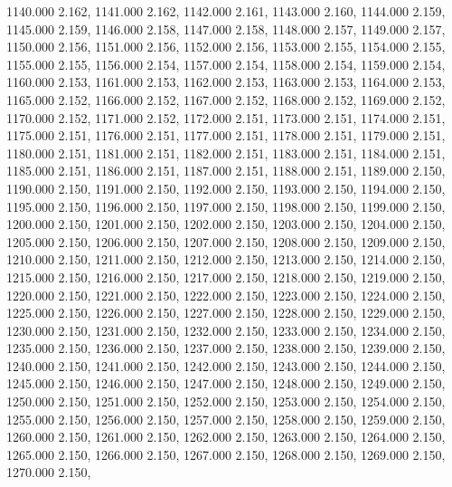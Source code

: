 1140.000 2.162, 
1141.000 2.162, 
1142.000 2.161, 
1143.000 2.160, 
1144.000 2.159, 
1145.000 2.159, 
1146.000 2.158, 
1147.000 2.158, 
1148.000 2.157, 
1149.000 2.157, 
1150.000 2.156, 
1151.000 2.156, 
1152.000 2.156, 
1153.000 2.155, 
1154.000 2.155, 
1155.000 2.155, 
1156.000 2.154, 
1157.000 2.154, 
1158.000 2.154, 
1159.000 2.154, 
1160.000 2.153, 
1161.000 2.153, 
1162.000 2.153, 
1163.000 2.153, 
1164.000 2.153, 
1165.000 2.152, 
1166.000 2.152, 
1167.000 2.152, 
1168.000 2.152, 
1169.000 2.152, 
1170.000 2.152, 
1171.000 2.152, 
1172.000 2.151, 
1173.000 2.151, 
1174.000 2.151, 
1175.000 2.151, 
1176.000 2.151, 
1177.000 2.151, 
1178.000 2.151, 
1179.000 2.151, 
1180.000 2.151, 
1181.000 2.151, 
1182.000 2.151, 
1183.000 2.151, 
1184.000 2.151, 
1185.000 2.151, 
1186.000 2.151, 
1187.000 2.151, 
1188.000 2.151, 
1189.000 2.150, 
1190.000 2.150, 
1191.000 2.150, 
1192.000 2.150, 
1193.000 2.150, 
1194.000 2.150, 
1195.000 2.150, 
1196.000 2.150, 
1197.000 2.150, 
1198.000 2.150, 
1199.000 2.150, 
1200.000 2.150, 
1201.000 2.150, 
1202.000 2.150, 
1203.000 2.150, 
1204.000 2.150, 
1205.000 2.150, 
1206.000 2.150, 
1207.000 2.150, 
1208.000 2.150, 
1209.000 2.150, 
1210.000 2.150, 
1211.000 2.150, 
1212.000 2.150, 
1213.000 2.150, 
1214.000 2.150, 
1215.000 2.150, 
1216.000 2.150, 
1217.000 2.150, 
1218.000 2.150, 
1219.000 2.150, 
1220.000 2.150, 
1221.000 2.150, 
1222.000 2.150, 
1223.000 2.150, 
1224.000 2.150, 
1225.000 2.150, 
1226.000 2.150, 
1227.000 2.150, 
1228.000 2.150, 
1229.000 2.150, 
1230.000 2.150, 
1231.000 2.150, 
1232.000 2.150, 
1233.000 2.150, 
1234.000 2.150, 
1235.000 2.150, 
1236.000 2.150, 
1237.000 2.150, 
1238.000 2.150, 
1239.000 2.150, 
1240.000 2.150, 
1241.000 2.150, 
1242.000 2.150, 
1243.000 2.150, 
1244.000 2.150, 
1245.000 2.150, 
1246.000 2.150, 
1247.000 2.150, 
1248.000 2.150, 
1249.000 2.150, 
1250.000 2.150, 
1251.000 2.150, 
1252.000 2.150, 
1253.000 2.150, 
1254.000 2.150, 
1255.000 2.150, 
1256.000 2.150, 
1257.000 2.150, 
1258.000 2.150, 
1259.000 2.150, 
1260.000 2.150, 
1261.000 2.150, 
1262.000 2.150, 
1263.000 2.150, 
1264.000 2.150, 
1265.000 2.150, 
1266.000 2.150, 
1267.000 2.150, 
1268.000 2.150, 
1269.000 2.150, 
1270.000 2.150, 
